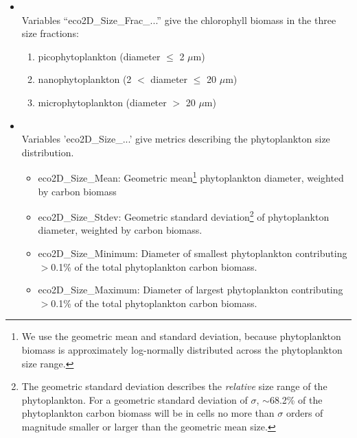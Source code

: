 \vspace{2mm}
\begin{itemize}[noitemsep]

\item[\textbf{Size fractions}] \
\\Variables  ``\textsf{\footnotesize eco2D\_Size\_Frac\_...}'' give the chlorophyll biomass in the three size fractions:
\vspace{1mm}
\begin{enumerate}[noitemsep]
\item picophytoplankton (diameter $\le$ 2 $\mu$m)
\item nanophytoplankton (2 $<$ diameter $\le$ 20 $\mu$m)
\item microphytoplankton (diameter $>$ 20 $\mu$m)
\end{enumerate}
\vspace{1mm}

\newpage

\item[\textbf{Size metrics}] \
\\Variables  '\textsf{\footnotesize eco2D\_Size\_...}' give metrics describing the {phytoplankton} size distribution.
\vspace{1mm}
\begin{itemize}[noitemsep]
\item \textsf{\footnotesize eco2D\_Size\_Mean}: Geometric mean\footnote{ We use the geometric mean and standard deviation, because phytoplankton biomass is approximately log-normally distributed across the phytoplankton size range.} phytoplankton diameter, weighted by carbon biomass
\item \textsf{\footnotesize eco2D\_Size\_Stdev}: Geometric standard deviation\footnote{ The geometric standard deviation describes the \textit{relative} size range of the phytoplankton. For a geometric standard deviation of $\sigma$, $\sim$68.2\% of the phytoplankton carbon biomass will be in cells no more than $\sigma$ orders of magnitude smaller or larger than the geometric mean size.} of phytoplankton diameter, weighted by carbon biomass.
\item \textsf{\footnotesize eco2D\_Size\_Minimum}: Diameter of smallest phytoplankton contributing $>$0.1\% of the total phytoplankton carbon biomass.
\item \textsf{\footnotesize eco2D\_Size\_Maximum}: Diameter of largest phytoplankton contributing $>$0.1\% of the total phytoplankton carbon biomass.
\end{itemize}
\vspace{1mm}


\end{itemize}
